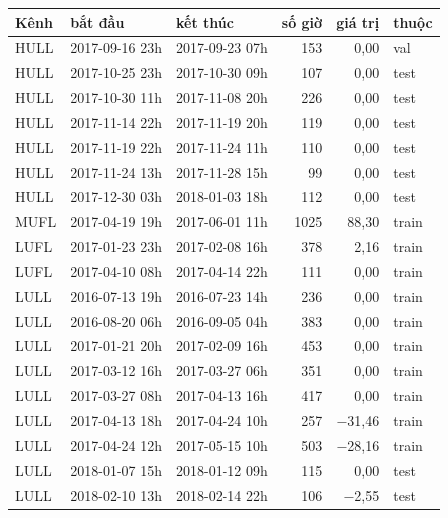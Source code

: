 {\footnotesize
\begin{longtable}{@{}l ll r r l@{}}
\toprule
Kênh & bắt đầu & kết thúc & số giờ & giá trị & thuộc \\
\midrule
\endhead
HULL & 2017-09-16 23h & 2017-09-23 07h & 153 & 0{,}00 & val \\
HULL & 2017-10-25 23h & 2017-10-30 09h & 107 & 0{,}00 & test \\
HULL & 2017-10-30 11h & 2017-11-08 20h & 226 & 0{,}00 & test \\
HULL & 2017-11-14 22h & 2017-11-19 20h & 119 & 0{,}00 & test \\
HULL & 2017-11-19 22h & 2017-11-24 11h & 110 & 0{,}00 & test \\
HULL & 2017-11-24 13h & 2017-11-28 15h & 99 & 0{,}00 & test \\
HULL & 2017-12-30 03h & 2018-01-03 18h & 112 & 0{,}00 & test \\
MUFL & 2017-04-19 19h & 2017-06-01 11h & 1025 & 88{,}30 & train \\
LUFL & 2017-01-23 23h & 2017-02-08 16h & 378 & 2{,}16 & train \\
LUFL & 2017-04-10 08h & 2017-04-14 22h & 111 & 0{,}00 & train \\
LULL & 2016-07-13 19h & 2016-07-23 14h & 236 & 0{,}00 & train \\
LULL & 2016-08-20 06h & 2016-09-05 04h & 383 & 0{,}00 & train \\
LULL & 2017-01-21 20h & 2017-02-09 16h & 453 & 0{,}00 & train \\
LULL & 2017-03-12 16h & 2017-03-27 06h & 351 & 0{,}00 & train \\
LULL & 2017-03-27 08h & 2017-04-13 16h & 417 & 0{,}00 & train \\
LULL & 2017-04-13 18h & 2017-04-24 10h & 257 & $-$31{,}46 & train \\
LULL & 2017-04-24 12h & 2017-05-15 10h & 503 & $-$28{,}16 & train \\
LULL & 2018-01-07 15h & 2018-01-12 09h & 115 & 0{,}00 & test \\
LULL & 2018-02-10 13h & 2018-02-14 22h & 106 & $-$2{,}55 & test \\
\bottomrule
\end{longtable}
}
